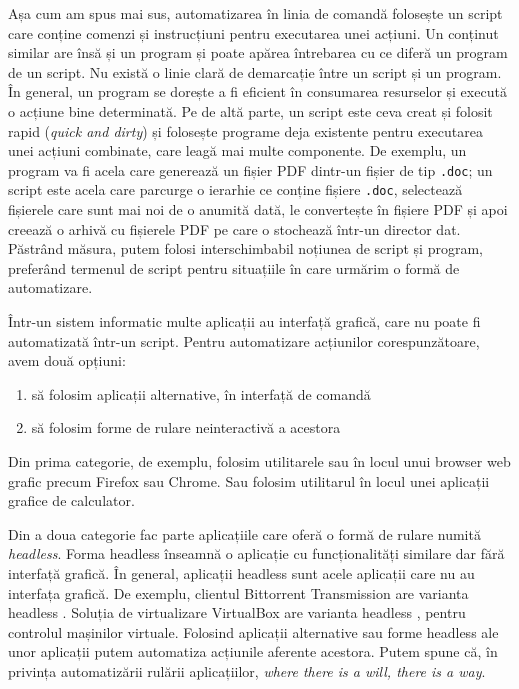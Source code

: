 Așa cum am spus mai sus, automatizarea în linia de comandă folosește un script care conține comenzi și instrucțiuni pentru executarea unei acțiuni.
Un conținut similar are însă și un program și poate apărea întrebarea cu ce diferă un program de un script.
Nu există o linie clară de demarcație între un script și un program.
În general, un program se dorește a fi eficient în consumarea resurselor și execută o acțiune bine determinată.
Pe de altă parte, un script este ceva creat și folosit rapid (\textit{quick and dirty}) și folosește programe deja existente pentru executarea unei acțiuni combinate, care leagă mai multe componente.
De exemplu, un program va fi acela care generează un fișier PDF dintr-un fișier de tip \texttt{.doc}; un script este acela care parcurge o ierarhie ce conține fișiere \texttt{.doc}, selectează fișierele care sunt mai noi de o anumită dată, le convertește în fișiere PDF și apoi creează o arhivă cu fișierele PDF pe care o stochează într-un director dat.
Păstrând măsura, putem folosi interschimbabil noțiunea de script și program, preferând termenul de script pentru situațiile în care urmărim o formă de automatizare.

Într-un sistem informatic multe aplicații au interfață grafică, care nu poate fi automatizată într-un script.
Pentru automatizare acțiunilor corespunzătoare, avem două opțiuni:
\begin{enumerate}
 \item să folosim aplicații alternative, în interfață de comandă
 \item să folosim forme de rulare neinteractivă a acestora
\end{enumerate}

Din prima categorie, de exemplu, folosim utilitarele  sau  în locul unui browser web grafic precum Firefox sau Chrome.
Sau folosim utilitarul  în locul unei aplicații grafice de calculator.

Din a doua categorie fac parte aplicațiile care oferă o formă de rulare numită \textit{headless}.
Forma headless înseamnă o aplicație cu funcționalități similare dar fără interfață grafică.
În general, aplicații headless sunt acele aplicații care nu au interfața grafică.
De exemplu, clientul Bittorrent Transmission are varianta headless .
Soluția de virtualizare VirtualBox are varianta headless , pentru controlul mașinilor virtuale.
Folosind aplicații alternative sau forme headless ale unor aplicații putem automatiza acțiunile aferente acestora.
Putem spune că, în privința automatizării rulării aplicațiilor, \textit{where there is a will, there is a way}.

